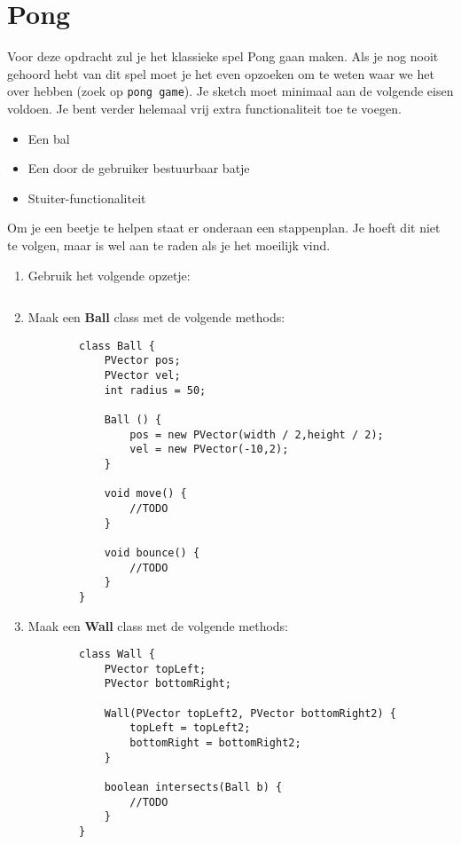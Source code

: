 \documentclass{../qh_assignment}
\begin{document}
\section{Pong}
Voor deze opdracht zul je het klassieke spel Pong gaan maken. Als je nog nooit gehoord hebt van dit spel moet je het even opzoeken om te weten waar we het over hebben (zoek op \texttt{pong game}). Je sketch moet minimaal aan de volgende eisen voldoen. Je bent verder helemaal vrij extra functionaliteit toe te voegen. 
\begin{itemize}
    \item Een bal
    \item Een door de gebruiker bestuurbaar batje
    \item Stuiter-functionaliteit
\end{itemize}
Om je een beetje te helpen staat er onderaan een stappenplan. Je hoeft dit niet te volgen, maar is wel aan te raden als je het moeilijk vind.
\begin{enumerate}
    \item Gebruik het volgende opzetje:
        \begin{lstlisting}

        \end{lstlisting}
    \item Maak een \textbf{Ball} class met de volgende methods:
        \begin{lstlisting}
        class Ball {
            PVector pos;
            PVector vel; 
            int radius = 50;
            
            Ball () {
                pos = new PVector(width / 2,height / 2);
                vel = new PVector(-10,2);
            }
            
            void move() {
                //TODO
            }
            
            void bounce() {
                //TODO
            }
        }    
        \end{lstlisting}
        \item Maak een \textbf{Wall} class met de volgende methods:
        \begin{lstlisting}
        class Wall {
            PVector topLeft;
            PVector bottomRight;
            
            Wall(PVector topLeft2, PVector bottomRight2) {
                topLeft = topLeft2;
                bottomRight = bottomRight2;
            }
            
            boolean intersects(Ball b) {
                //TODO
            }
        }    
        \end{lstlisting}
\end{enumerate}
\end{document}

